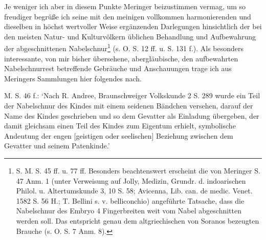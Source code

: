\documentclass[a4paper, 11pt, oneside]{article}
\begin{document}
Je weniger ich aber in diesem Punkte Meringer beizustimmen vermag, um so freudiger begrüße ich seine mit den meinigen vollkommen harmonierenden und dieselben in höchst wertvoller Weise ergänzenden Darlegungen hinsichtlich der bei den meisten Natur- und Kulturvölkern üblichen Behandlung und Aufbewahrung der abgeschnittenen Nabelschnur\footnote{S. M. S. 45 ff. u. 77 ff. Besonders beachtenswert erscheint die von Meringer S. 47 Anm. 1 (unter Verweisung auf Jolly, Medizin, Grundr. d. indoarischen Philol. u. Altertumskunde 3, 10 S. 58; Avicenna, Lib. can. de medic. Venet. 1582 S. 56 H.; T. Bellini s. v. belliconchio) angeführte Tatsache, dass die Nabelschnur des Embryo 4 Fingerbreiten weit vom Nabel abgeschnitten werden soll. Das entspricht genau dem altgriechischen von Soranos bezeugten Brauche (s. O. S. 7 Anm. 8).} (s. O. S. 12 ff. u. S. 131 f.). Als besonders interessante, von mir bisher übersehene, abergläubische, den aufbewahrten Nabelschnurrest betreffende Gebräuche und Anschauungen trage ich aus Meringers Sammlungen hier folgendes nach.

M. S. 46 f.: `Nach R. Andree, Braunschweiger Volkskunde 2 S. 289 wurde ein Teil der Nabelschnur des Kindes mit einem seidenen Bändchen versehen, darauf der Name des Kindes geschrieben und so dem Gevatter als Einladung übergeben, der damit gleichsam einen Teil des Kindes zum Eigentum erhielt, symbolische Andeutung der engen [geistigen oder seelischen] Beziehung zwischen dem Gevatter und seinem Patenkinde.'
\end{document}
